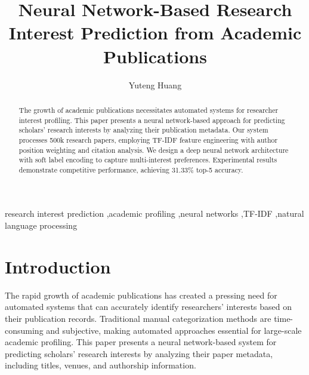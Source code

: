 \documentclass[preprint,12pt]{elsarticle}
\begin{document}
\begin{frontmatter}


\title{Neural Network-Based Research Interest Prediction from Academic Publications}

\author{Yuteng Huang}

\affiliation{}

\begin{abstract}
The growth of academic publications necessitates automated systems for researcher interest profiling.
This paper presents a neural network-based approach for predicting scholars' research interests by analyzing their publication metadata.
Our system processes 500k research papers, employing TF-IDF feature engineering with author position weighting and citation analysis.
We design a deep neural network architecture with soft label encoding to capture multi-interest preferences.
Experimental results demonstrate competitive performance, achieving 31.33\% top-5 accuracy.
\end{abstract}



\begin{keyword}
research interest prediction \sep academic profiling \sep neural networks \sep TF-IDF \sep natural language processing
\end{keyword}

\end{frontmatter}


\section{Introduction}
\label{sec1}

The rapid growth of academic publications has created a pressing need for automated systems that can accurately identify researchers' interests based on their publication records.
Traditional manual categorization methods are time-consuming and subjective, making automated approaches essential for large-scale academic profiling.
This paper presents a neural network-based system for predicting scholars' research interests by analyzing their paper metadata, including titles, venues, and authorship information.
\end{document}
